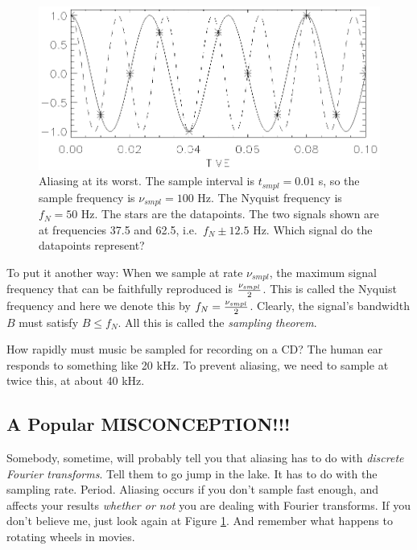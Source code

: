 \documentclass[psfig,preprint]{aastex}
\begin{document}
\begin{figure}[!h]
\begin{center}
\leavevmode
\includegraphics{fig1.ps}
\end{center}

\caption{Aliasing at its worst. The sample interval is $t_{smpl}= 0.01$
s, so the sample frequency is $\nu_{smpl} = 100$ Hz. The Nyquist
frequency is $f_N=50$ Hz. The stars are the datapoints. The two signals
shown are at frequencies 37.5 and 62.5, i.e.\ $f_N \pm 12.5$ Hz. Which
signal do the datapoints represent? \label{figone} }
\end{figure}

	To put it another way: When we sample at rate $\nu_{smpl}$, the
maximum signal frequency that can be faithfully reproduced is
$\nu_{smpl} \over 2$.  This is called the Nyquist frequency and here we
denote this by $f_N = {\nu_{smpl} \over 2}$.  Clearly, the signal's
bandwidth $B$ must satisfy $B \le f_N$. All this is called the {\it
sampling theorem}.

	How rapidly must music be sampled for recording on a CD? The
human ear responds to something like 20 kHz.  To prevent aliasing, we
need to sample at twice this, at about 40 kHz. 

\subsection {A Popular MISCONCEPTION!!!}

	Somebody, sometime, will probably tell you that aliasing has to
do with {\it discrete Fourier transforms}.  Tell them to go jump in the
lake.  It has to do with the sampling rate.  Period.  Aliasing occurs if
you don't sample fast enough, and affects your results {\it whether or
not} you are dealing with Fourier transforms.  If you don't believe me,
just look again at Figure \ref{figone}. And remember what happens to rotating
wheels in movies. 
\end{document}
